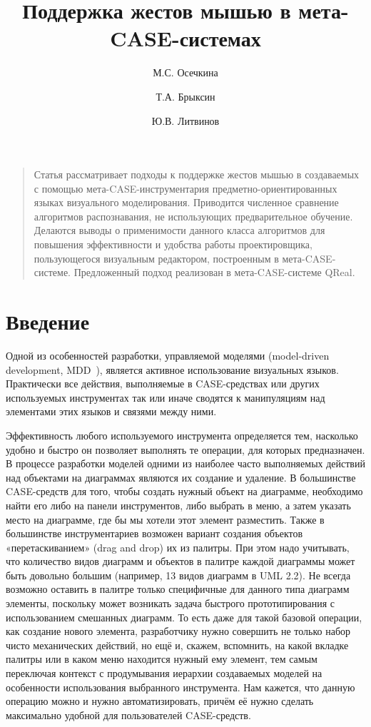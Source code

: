 \documentclass[a5paper]{article}
\title{Поддержка жестов мышью в мета-CASE-системах}
\author{М.С. Осечкина \and Т.А. Брыксин \and Ю.В. Литвинов}
\date{}
\begin{document}
\maketitle
\thispagestyle{empty}

\begin{quote}
\small\noindent
Статья рассматривает подходы к поддержке жестов мышью в создаваемых с помощью мета-CASE-инструментария предметно-ориентированных языках визуального моделирования. Приводится численное сравнение алгоритмов распознавания, не использующих предварительное обучение. Делаются выводы о применимости данного класса алгоритмов для повышения эффективности и удобства работы проектировщика, пользующегося визуальным редактором, построенным в мета-CASE-системе. Предложенный подход реализован в мета-CASE-системе QReal.
\end{quote}

\section*{Введение}
Одной из особенностей разработки, управляемой моделями (model-driven development, MDD~\cite{mde}), является активное использование визуальных языков. Практически все действия, выполняемые в CASE-средствах или других используемых инструментах так или иначе сводятся к манипуляциям над элементами этих языков и связями между ними. 

Эффективность любого используемого инструмента определяется тем, насколько удобно и быстро он позволяет выполнять те операции, для которых предназначен. В процессе разработки моделей одними из наиболее часто выполняемых действий над объектами на диаграммах являются их создание и удаление.  В большинстве CASE-средств для того, чтобы создать нужный объект на диаграмме, необходимо найти его либо на панели инструментов, либо выбрать в меню, а затем указать место на диаграмме, где бы мы хотели этот элемент разместить. Также в большинстве инструментариев возможен вариант создания объектов «перетаскиванием» (drag and drop) их из палитры. При этом надо учитывать, что количество видов диаграмм и объектов в палитре каждой диаграммы может быть довольно большим (например, 13 видов диаграмм в UML 2.2). Не всегда возможно оставить в палитре только специфичные для данного типа диаграмм элементы, поскольку может возникать задача быстрого прототипирования с использованием смешанных диаграмм. То есть даже для такой базовой операции, как создание нового элемента, разработчику нужно совершить не только набор чисто механических действий, но ещё и, скажем, вспомнить, на какой вкладке палитры или в каком меню находится нужный ему элемент, тем самым переключая контекст с продумывания иерархии создаваемых моделей на особенности использования выбранного инструмента. Нам кажется, что данную операцию можно и нужно автоматизировать, причём её нужно сделать максимально удобной для пользователей CASE-средств. 
\end{document}
